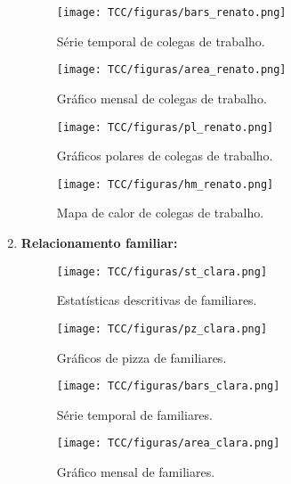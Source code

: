 \begin{enumerate}
    \begin{figure}[H]
        \centering
        \texttt{[image: TCC/figuras/bars\_renato.png]}
        \caption{Série temporal de colegas de trabalho.}
        \label{bars-trabalho}
    \end{figure}
    
    \begin{figure}[H]
        \centering
        \texttt{[image: TCC/figuras/area\_renato.png]}
        \caption{Gráfico mensal de colegas de trabalho.}
        \label{area-trabalho}
    \end{figure}
    
    \begin{figure}[H]
        \centering
        \texttt{[image: TCC/figuras/pl\_renato.png]}
        \caption{Gráficos polares de colegas de trabalho.}
        \label{pl-trabalho}
    \end{figure}
    
    \begin{figure}[H]
        \centering
        \texttt{[image: TCC/figuras/hm\_renato.png]}
        \caption{Mapa de calor de colegas de trabalho.}
        \label{hm-trabalho}
    \end{figure}
  
  \item \textbf{Relacionamento familiar:}
    \begin{figure}[H]
        \centering
        \texttt{[image: TCC/figuras/st\_clara.png]}
        \caption{Estatísticas descritivas de familiares.}
        \label{ds-familia}
    \end{figure}
    
    \begin{figure}[H]
        \centering
        \texttt{[image: TCC/figuras/pz\_clara.png]}
        \caption{Gráficos de pizza de familiares.}
        \label{pz-familia}
    \end{figure}
    
    \begin{figure}[H]
        \centering
        \texttt{[image: TCC/figuras/bars\_clara.png]}
        \caption{Série temporal de familiares.}
        \label{bars-familia}
    \end{figure}
    
    \begin{figure}[H]
        \centering
        \texttt{[image: TCC/figuras/area\_clara.png]}
        \caption{Gráfico mensal de familiares.}
        \label{area-familia}
    \end{figure}
    

\end{enumerate}
